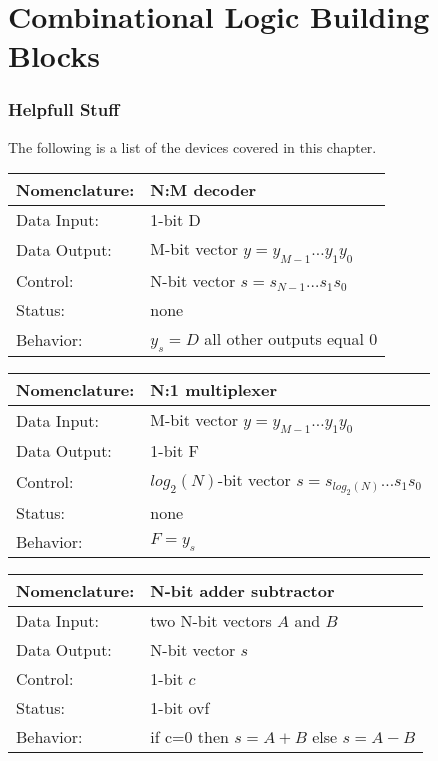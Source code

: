 \chapter{Combinational Logic Building Blocks}
\graphicspath{ {./chapter04/FigWork} }

\subsection{Helpfull Stuff}
The following is a list of the devices covered in this chapter.

\begin{tabular}{|l|p{3.5in}|} \hline
Nomenclature:  & N:M decoder				\\ \hline
Data Input:    & 1-bit D		\\ \hline
Data Output:   & M-bit vector $y = y_{M-1} \ldots y_1 y_0$	\\ \hline
Control:       & N-bit vector $s = s_{N-1} \ldots s_1 s_0$	\\ \hline
Status:        & none					\\ \hline
Behavior:      & $y_s = D$ all other outputs equal 0	\\ \hline
\end{tabular}

\begin{tabular}{|l|p{3.5in}|} \hline
Nomenclature:  & N:1 multiplexer                        \\ \hline
Data Input:    & M-bit vector $y=y_{M-1} \ldots y_1 y_0$    \\ \hline
Data Output:   & 1-bit F          \\ \hline
Control:       & $log_2(N)$-bit vector $s = s_{log_2(N)} \ldots s_1 s_0$	\\ \hline
Status:        & none                                   \\ \hline
Behavior:      & $F = y_s$				\\ \hline
\end{tabular}


\begin{tabular}{|l|p{3.5in}|} \hline
Nomenclature:  & N-bit adder subtractor                 \\ \hline
Data Input:    & two N-bit vectors $A$ and $B$           \\ \hline  
Data Output:   & N-bit vector  $s$               \\ \hline
Control:       & 1-bit $c$                     \\ \hline
Status:        & 1-bit ovf 				\\ \hline
Behavior:      & if c=0 then $s = A+B$ else $s=A-B$     \\ \hline
\end{tabular}


